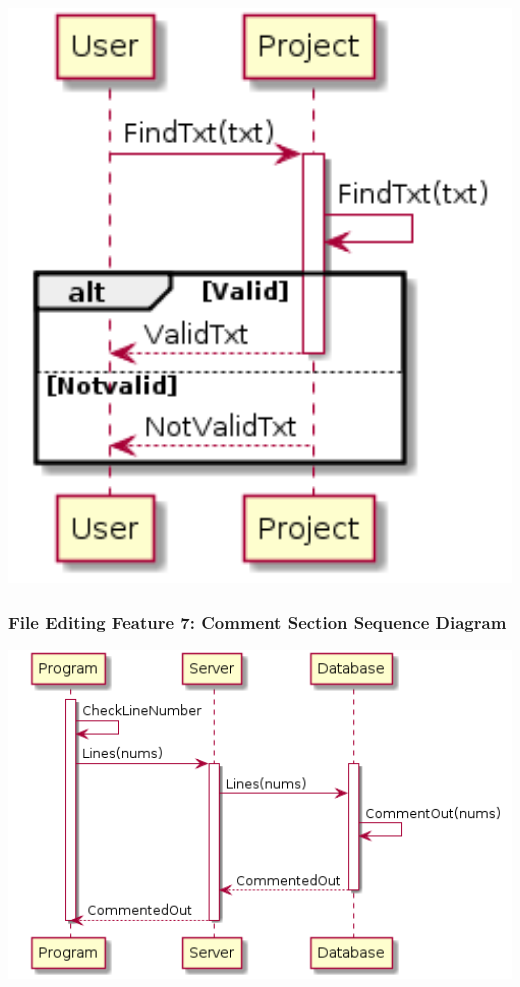 \documentclass[twoside,letterpaper]{article}
\begin{document}
	\includegraphics[width=6.0in]{images/SequenceDiagrams/FindTxt}
	
	\newpage
	
	\subsubsection[File Editing Feature 7: Comment Section Sequence Diagram]{\rmfamily\bfseries\color{black}
		File Editing Feature 7: Comment Section Sequence Diagram}
	\hypertarget{RefHeading22059017292}{}
	
	\bigskip
	
	\includegraphics[width=6.0in]{images/SequenceDiagrams/CommentOut}
	
\end{document}
